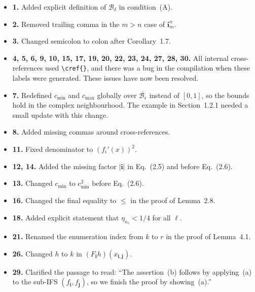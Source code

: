 \documentclass[11pt]{article}
\begin{document}
\begin{itemize}[leftmargin=*]

\item \textbf{1.} Added explicit definition of $\mathcal{B}_\delta$ in condition~(A).

\item \textbf{2.} Removed trailing comma in the $m>n$ case of $\mathbf{i}_m^n$.

\item \textbf{3.} Changed semicolon to colon after Corollary~1.7.

\item \textbf{4, 5, 6, 9, 10, 15, 17, 19, 20, 22, 23, 24, 27, 28, 30.}
All internal cross-references used \texttt{\textbackslash cref\{\}}, and there was a bug in the
compilation when these labels were generated. These issues have now been resolved.

\item \textbf{7.} Redefined $c_{\min}$ and $c_{\max}$ globally over
$\overline{\mathcal{B}_\epsilon}$ instead of $[0,1]$, so the bounds hold in the complex
neighbourhood. The example in Section~1.2.1 needed a small update with this change.

\item \textbf{8.} Added missing commas around cross-references.

\item \textbf{11.} Fixed denominator to $(f_i'(x))^2$.

\item \textbf{12, 14.} Added the missing factor $|\mathbf{i}|$ in Eq.~(2.5) and before Eq.~(2.6).

\item \textbf{13.} Changed $c_{\min}$ to $c_{\min}^2$ before Eq.~(2.6).

\item \textbf{16.} Changed the final equality to $\leq$ in the proof of Lemma~2.8.

\item \textbf{18.} Added explicit statement that $\eta_{n_\ell}<1/4$ for all $\ell$.

\item \textbf{21.} Renamed the enumeration index from $k$ to $r$ in the proof of Lemma~4.1.

\item \textbf{26.} Changed $h$ to $k$ in $(F_{\mathbf{i}}h)(x_{\mathbf{i},\mathbf{j}})$.

\item \textbf{29.} Clarified the passage to read: ``The assertion~(b) follows by applying~(a) to
the sub-IFS $(f_{\mathbf{i}}, f_{\mathbf{j}})$, so we finish the proof by showing~(a).''

\end{itemize}
\end{document}

